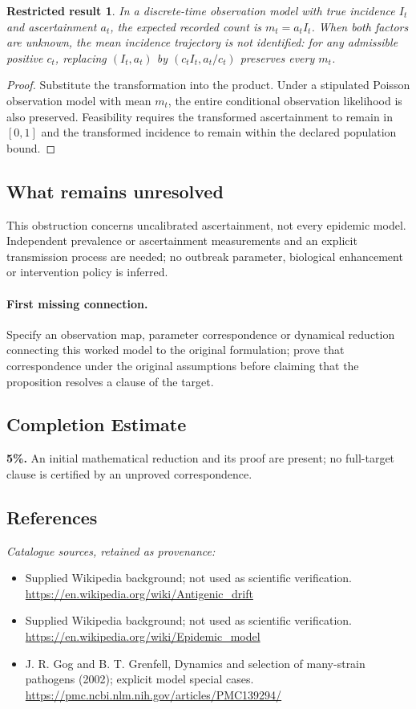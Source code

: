 \documentclass[11pt]{article}
\newtheorem{attemptresult}{Restricted result}[section]
\begin{document}
\begin{attemptresult}
In a discrete-time observation model with true incidence $I_t$ and ascertainment $a_t$, the expected recorded count is $m_t=a_tI_t$. When both factors are unknown, the mean incidence trajectory is not identified: for any admissible positive $c_t$, replacing $(I_t,a_t)$ by $(c_tI_t,a_t/c_t)$ preserves every $m_t$.
\end{attemptresult}
\begin{proof}
Substitute the transformation into the product. Under a stipulated Poisson observation model with mean $m_t$, the entire conditional observation likelihood is also preserved. Feasibility requires the transformed ascertainment to remain in $[0,1]$ and the transformed incidence to remain within the declared population bound.
\end{proof}
\subsection{What remains unresolved}
This obstruction concerns uncalibrated ascertainment, not every epidemic model. Independent prevalence or ascertainment measurements and an explicit transmission process are needed; no outbreak parameter, biological enhancement or intervention policy is inferred.
\paragraph{First missing connection.} Specify an observation map, parameter correspondence or dynamical reduction connecting this worked model to the original formulation; prove that correspondence under the original assumptions before claiming that the proposition resolves a clause of the target.
\subsection{Completion Estimate}
\textbf{5\%.} An initial mathematical reduction and its proof are present; no full-target clause is certified by an unproved correspondence.
\subsection{References}
\noindent\emph{Catalogue sources, retained as provenance:}
\begin{itemize}
\item Supplied Wikipedia background; not used as scientific verification. \url{https://en.wikipedia.org/wiki/Antigenic_drift}
\item Supplied Wikipedia background; not used as scientific verification. \url{https://en.wikipedia.org/wiki/Epidemic_model}
\item J. R. Gog and B. T. Grenfell, Dynamics and selection of many-strain pathogens (2002); explicit model special cases. \url{https://pmc.ncbi.nlm.nih.gov/articles/PMC139294/}
\end{itemize}
\clearpage
\end{document}
